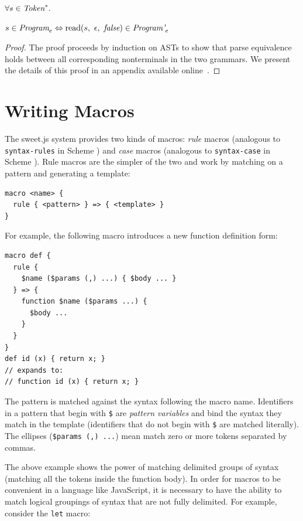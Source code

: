 \documentclass[9pt]{sigplanconf}
\begin{document}
\begin{theorem}\mbox{}

  \( \forall s \in \textit{Token}^*. \)

  \( s \in \textit{Program}_{e} \Leftrightarrow 
  \textrm{read}(s,~\epsilon,~\textit{false}) \in \textit{Program'}_{e} \)

\end{theorem}
\begin{proof}\mbox{}
  The proof proceeds by induction on ASTs to show that parse
  equivalence holds between all corresponding nonterminals in the two
  grammars. We present the details of this proof in an
  appendix available online~\cite{sweetjsappendix}.
\end{proof}




\section{Writing Macros}
\label{sec:writingMacros}

The sweet.js system provides two kinds of macros: \emph{rule} macros
(analogous to \verb!syntax-rules! in Scheme \cite{Clinger1991})
and \emph{case} macros (analogous to \verb!syntax-case! in
Scheme \cite{Hieb1992}). Rule macros are the simpler of the two and work by matching
on a pattern and generating a template:

\begin{lstlisting}
macro <name> {
  rule { <pattern> } => { <template> }
}
\end{lstlisting}

For example, the following macro introduces a new function definition
form:

\begin{lstlisting}
macro def {
  rule { 
    $name ($params (,) ...) { $body ... } 
  } => {
    function $name ($params ...) {
      $body ...
    }
  }
}
def id (x) { return x; }
// expands to:
// function id (x) { return x; }
\end{lstlisting}

The pattern is matched against the syntax following the macro name.
Identifiers in a pattern that begin with \verb!$! are
\emph{pattern variables} and bind the syntax they match in the
template (identifiers that do not begin with \verb!$! are matched
literally). The ellipses (\verb!$params (,) ...!) mean match zero or more
tokens separated by commas.

The above example shows the power of matching delimited groups of
syntax (\ie matching all the tokens inside the function body). In
order for macros to be convenient in a language like JavaScript, it is
necessary to have the ability to match logical groupings of syntax
that are not fully delimited. For example, consider the
\verb!let! macro:
\end{document}
